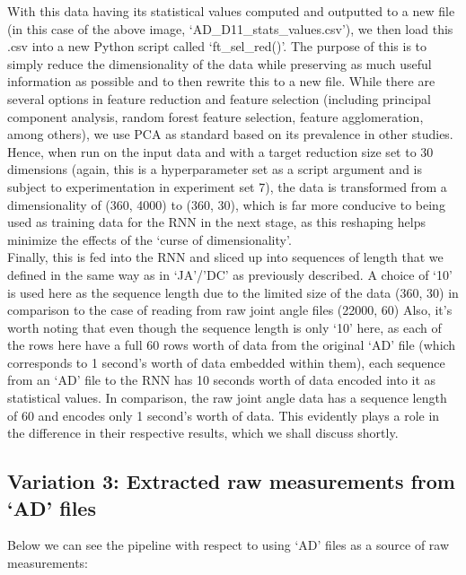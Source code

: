 \documentclass[12pt,twoside]{report}
\begin{document}
\quad With this data having its statistical values computed and outputted to a new file (in this case of the above image, ‘AD\_D11\_stats\_values.csv’), we then load this .csv into a new Python script called ‘ft\_sel\_red()’. The purpose of this is to simply reduce the dimensionality of the data while preserving as much useful information as possible and to then rewrite this to a new file. While there are several options in feature reduction and feature selection (including principal component analysis, random forest feature selection, feature agglomeration, among others), we use PCA as standard based on its prevalence in other studies. Hence, when run on the input data and with a target reduction size set to 30 dimensions (again, this is a hyperparameter set as a script argument and is subject to experimentation in experiment set 7), the data is transformed from a dimensionality of (360, 4000) to (360, 30), which is far more conducive to being used as training data for the RNN in the next stage, as this reshaping helps minimize the effects of the ‘curse of dimensionality’.\\

\quad Finally, this is fed into the RNN and sliced up into sequences of length that we defined in the same way as in ‘JA’/’DC’ as previously described. A choice of ‘10’ is used here as the sequence length due to the limited size of the data (360, 30) in comparison to the case of reading from raw joint angle files (22000, 60) Also, it’s worth noting that even though the sequence length is only ‘10’ here, as each of the rows here have a full 60 rows worth of data from the original ‘AD’ file (which corresponds to 1 second’s worth of data embedded within them), each sequence from an ‘AD’ file to the RNN has 10 seconds worth of data encoded into it as statistical values. In comparison, the raw joint angle data has a sequence length of 60 and encodes only 1 second’s worth of data. This evidently plays a role in the difference in their respective results, which we shall discuss shortly.

\subsection{Variation 3: Extracted raw measurements from ‘AD’ files}

\quad Below we can see the pipeline with respect to using ‘AD’ files as a source of raw measurements:
\end{document}

